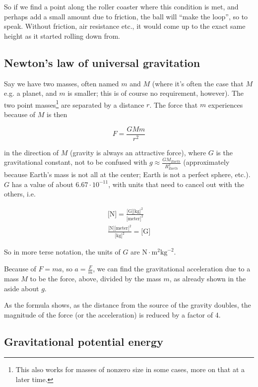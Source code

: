 So if we find a point along the roller coaster where this condition is met, and perhaps add a small amount due to friction, the ball will ``make the loop'', so to speak. Without friction, air resistance etc., it would come up to the exact same height as it started rolling down from.

\subsection{Newton's law of universal gravitation}

Say we have two masses, often named $m$ and $M$ (where it's often the case that $M$ e.g. a planet, and $m$ is smaller; this is of course no requirement, however). The two point masses\footnote{This also works for masses of nonzero size in some cases, more on that at a later time.} are separated by a distance $r$. The force that $m$ experiences because of $M$ is then

\begin{equation}
F = \frac{G M m}{r^2}
\end{equation}

in the direction of $M$ (gravity is always an attractive force), where $G$ is the gravitational constant, not to be confused with $\displaystyle g \approx \frac{G M_{Earth}}{R_{Earth}^2}$ (approximately because Earth's mass is not all at the center; Earth is not a perfect sphere, etc.).\\
$G$ has a value of about $6.67 \cdot 10^{-11}$, with units that need to cancel out with the others, i.e.

\begin{align}
\text{[N]} = \frac{\text{[G]} \text{[kg]}^2}{\text{[meter]}^2}\\
\frac{\text{[N]} \text{[meter]}^2}{\text{[kg]}^2} = \text{[G]}
\end{align}

So in more terse notation, the units of $G$ are $\text{N} \cdot \text{m}^2 \text{kg}^{-2}$.

Because of $F = ma$, so $\displaystyle a = \frac{F}{m}$, we can find the gravitational acceleration due to a mass $M$ to be the force, above, divided by the mass $m$, as already shown in the aside about $g$.

As the formula shows, as the distance from the source of the gravity doubles, the magnitude of the force (or the acceleration) is reduced by a factor of 4.

\subsection{Gravitational potential energy}

